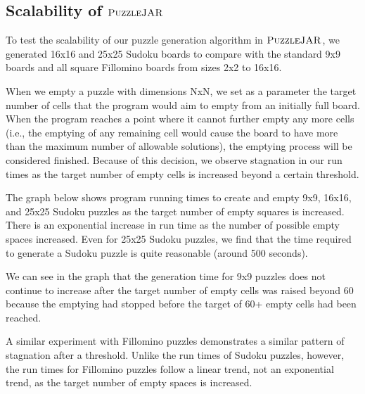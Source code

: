 \subsection{Scalability of $\textsc{PuzzleJAR}$}

To test the scalability of our puzzle generation algorithm in
$\textsc{PuzzleJAR}$, we generated 16x16 and 25x25 Sudoku boards to compare
with the standard 9x9 boards and all square Fillomino boards from
sizes 2x2 to 16x16.

When we empty a puzzle with dimensions NxN, we set as a parameter the
target number of cells that the program would aim to empty from an
initially full board. When the program reaches a point where it cannot
further empty any more cells (i.e., the emptying of any remaining cell
would cause the board to have more than the maximum number of
allowable solutions), the emptying process will be considered
finished. Because of this decision, we observe stagnation in our run times as
the target number of empty cells is increased beyond a certain
threshold.

The graph below shows program running times to create and empty 9x9, 16x16, and 25x25 Sudoku puzzles as the target number of empty squares is increased. There is an exponential increase in run time as the number of possible empty spaces increased. Even for 25x25 Sudoku puzzles, we find that the time required to generate a Sudoku puzzle is quite reasonable (around 500 seconds).

We can see in the graph that the generation time for 9x9 puzzles does not continue to increase after the target number of empty cells was raised beyond 60 because the emptying had stopped before the target of 60+ empty cells had been reached. 

A similar experiment with Fillomino puzzles demonstrates a similar pattern of stagnation after a threshold. Unlike the run times of Sudoku puzzles, however, the run times for Fillomino puzzles follow a linear trend, not an exponential trend, as the target number of empty spaces is increased.

